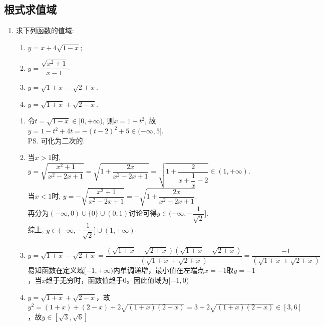 \subsection*{根式求值域}
\begin{enumerate}
    \item 求下列函数的值域:
    \begin{enumerate}
    \item $y=x+4\sqrt{1-x}$; 
    \item $y=\dfrac{\sqrt{x^2+1}}{x-1}$. 
    \item $y = \sqrt{1+x} - \sqrt{2+x}$.
    \item $y = \sqrt{1+x} + \sqrt{2-x}$.
    \end{enumerate}
    \begin{jieda}
    \begin{enumerate}
    \item 令$t=\sqrt{1-x}\in[0,+\infty)$, 则$x=1-t^2$, 故$y=1-t^2+4t=-(t-2)^2+5\in(-\infty,5]$. \\
    \ps 可化为二次的. 
    
    \item 当$x>1$时, $y=\sqrt{\dfrac{x^2+1}{x^2-2x+1}}=\sqrt{1+\dfrac{2x}{x^2-2x+1}}=\sqrt{1+\dfrac{2}{x+\dfrac{1}{x}-2}}\in(1,+\infty)$. \\
    当$x<1$时, $y=-\sqrt{\dfrac{x^2+1}{x^2-2x+1}}=-\sqrt{1+\dfrac{2x}{x^2-2x+1}}$. \\
    再分为$(-\infty,0)\cup\{0\}\cup(0,1)$讨论可得$y\in(-\infty,-\dfrac{1}{\sqrt{2}}]$. \\
    综上, $y\in(-\infty,-\dfrac{1}{\sqrt{2}}]\cup(1,+\infty)$.
    \item $y = \sqrt{1+x} - \sqrt{2+x} = \dfrac{(\sqrt{1+x} + \sqrt{2+x})(\sqrt{1+x} - \sqrt{2+x})}{(\sqrt{1+x} + \sqrt{2+x})} = \dfrac{-1}{(\sqrt{1+x} + \sqrt{2+x})}$ \\
    易知函数在定义域$[-1, +\infty)$内单调递增，最小值在左端点$x = -1$取$y = -1$，当$x$趋于无穷时，函数值趋于0。因此值域为$[-1, 0)$
    \item $y = \sqrt{1+x} + \sqrt{2-x}$，故$y^2 = (1+x) + (2-x) + 2\sqrt{(1+x)(2-x)}  = 3 + 2\sqrt{(1+x)(2-x)} \in [3, 6]$，故$y \in [\sqrt{3}, \sqrt{6}]$
    \end{enumerate}
    \end{jieda}
\end{enumerate}

